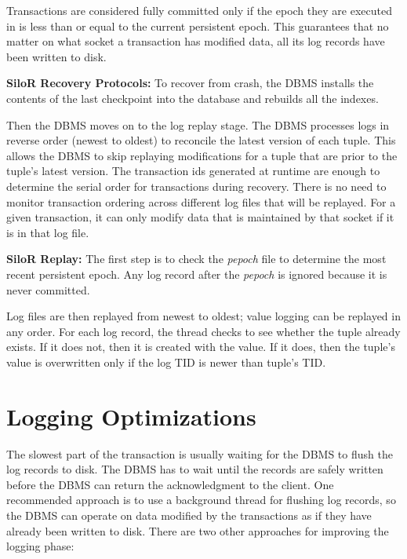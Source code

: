 \documentclass[11pt]{article}
\begin{document}
Transactions are considered fully committed only if the epoch they are executed in is less than or equal to the current persistent epoch. This guarantees that no matter on what socket a transaction has modified data, all its log records have been written to disk.

\textbf{SiloR Recovery Protocols:} To recover from crash, the DBMS installs the contents of the last checkpoint into the database and rebuilds all the indexes. 

Then the DBMS moves on to the log replay stage. The DBMS processes logs in reverse order (newest to oldest) to reconcile the latest version of each tuple. This allows the DBMS to skip replaying modifications for a tuple that are prior to the tuple's latest version. The transaction ids generated at runtime are enough to determine the serial order for transactions during recovery. There is no need to monitor transaction ordering across different log files that will be replayed. For a given transaction, it can only modify data that is maintained by that socket if it is in that log file.

\textbf{SiloR Replay:} The first step is to check the \textit{pepoch} file to determine the most recent persistent epoch. Any log record after the \textit{pepoch} is ignored because it is never committed. 

Log files are then replayed from newest to oldest; value logging can be replayed in any order. For each log record, the thread checks to see whether the tuple already exists. If it does not, then it is created with the value. If it does, then the tuple's value is overwritten only if the log TID is newer than tuple's TID.

\section{Logging Optimizations}
The slowest part of the transaction is usually waiting for the DBMS to flush the log records to disk. The DBMS has to wait until the records are safely written before the DBMS can return the acknowledgment to the client. One recommended approach is to use a background thread for flushing log records, so the DBMS can operate on data modified by the transactions as if they have already been written to disk. There are two other approaches for improving the logging phase:
\end{document}
